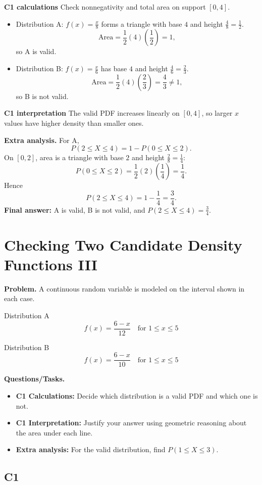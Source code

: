 \textbf{C1 calculations}
Check nonnegativity and total area on support $[0,4]$.
\begin{itemize}
	\item Distribution A: $f(x)=\frac{x}{8}$ forms a triangle with base $4$ and height $\frac{4}{8}=\frac12$.
	\[
	\text{Area}=\frac12(4)\left(\frac12\right)=1,
	\]
	so A is valid.
	\item Distribution B: $f(x)=\frac{x}{6}$ has base $4$ and height $\frac{4}{6}=\frac23$.
	\[
	\text{Area}=\frac12(4)\left(\frac23\right)=\frac43\ne1,
	\]
	so B is not valid.
\end{itemize}

\textbf{C1 interpretation}
The valid PDF increases linearly on $[0,4]$, so larger $x$ values have higher density than smaller ones.

\textbf{Extra analysis.}
For A,
\[
P(2\le X\le4)=1-P(0\le X\le2).
\]
On $[0,2]$, area is a triangle with base $2$ and height $\frac{2}{8}=\frac14$:
\[
P(0\le X\le2)=\frac12(2)\left(\frac14\right)=\frac14.
\]
Hence
\[
P(2\le X\le4)=1-\frac14=\frac34.
\]
\textbf{Final answer:} A is valid, B is not valid, and $P(2\le X\le4)=\frac34$.

	\section{Checking Two Candidate Density Functions III}
	
	\textbf{Problem.}
	A continuous random variable is modeled on the interval shown in each case.
	
	Distribution A
	\[
	f(x)=\frac{6-x}{12}\quad\text{for }1\le x\le 5
	\]
	
	Distribution B
	\[
	f(x)=\frac{6-x}{10}\quad\text{for }1\le x\le 5
	\]
	
	\textbf{Questions/Tasks.}
	\begin{itemize}
		\item \textbf{C1 Calculations:} Decide which distribution is a valid PDF and which one is not.
		\item \textbf{C1 Interpretation:} Justify your answer using geometric reasoning about the area under each line.
		\item \textbf{Extra analysis:} For the valid distribution, find $P(1\le X\le 3)$.
	\end{itemize}
	
	\subsection*{C1}
	
